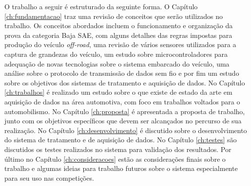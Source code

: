 O trabalho a seguir é estruturado da seguinte forma. O Capítulo \ref{ch:fundamentacao} traz uma revisão de conceitos que serão utilizados no trabalho. Os conceitos abordados incluem o funcionamento e organização da prova da categoria Baja SAE, com alguns detalhes das regras impostas para produção do veículo \textit{off-road}, uma revisão de vários sensores utilizados para a captura de grandezas do veículo, um estudo sobre microcontroladores para adequação de novas tecnologias sobre o sistema embarcado do veículo, uma análise sobre o protocolo de transmissão de dados sem fio e por fim um estudo sobre os objetivos dos sistemas de tratamento e aquisição de dados. No Capítulo \ref{ch:trabalhos} é realizado um estudo sobre o que existe de estado da arte em aquisição de dados na área automotiva, com foco em trabalhos voltados para o automobilismo. No Capítulo \ref{ch:proposta} é apresentada a proposta de trabalho, junto com os objetivos específicos que devem ser alcançados no percurso de sua realização. No Capítulo \ref{ch:desenvolvimento} é discutido sobre o desenvolvimento do sistema de tratamento e de aquisição de dados. No Capítulo \ref{ch:testes} são discutidos os testes realizados no sistema para validação dos resultados. Por último no Capítulo \ref{ch:consideracoes} estão as considerações finais sobre o trabalho e algumas ideias para trabalho futuros sobre o sistema especialmente para seu uso nas competições.  
